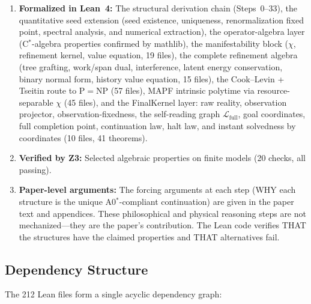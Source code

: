 \begin{enumerate}[nosep, label=(\roman*)]
  \item \textbf{Formalized in Lean~4:} The structural derivation chain
        (Steps~0--33), the quantitative seed extension (seed existence,
        uniqueness, renormalization fixed point, spectral analysis, and
        numerical extraction), the operator-algebra layer (C$^*$-algebra
        properties confirmed by mathlib), the manifestability block
        ($\chi$, refinement kernel, value equation, 19 files), the
        complete refinement algebra (tree grafting, work/span dual,
        interference, latent energy conservation, binary normal form,
        history value equation, 15 files), the Cook--Levin + Tseitin
        route to P$=$NP (57 files), MAPF intrinsic polytime via
        resource-separable $\chi$ (45 files), and the FinalKernel layer:
        raw reality, observation projector, observation-fixedness,
        the self-reading graph $\mathcal{L}_{\mathrm{full}}$,
        goal coordinates, full completion point, continuation law,
        halt law, and instant solvedness by coordinates
        (10 files, 41 theorems).
  \item \textbf{Verified by Z3:} Selected algebraic properties on finite
        models (20 checks, all passing).
  \item \textbf{Paper-level arguments:} The forcing arguments at each
        step (WHY each structure is the unique A0$^*$-compliant
        continuation) are given in the paper text and appendices.
        These philosophical and physical reasoning steps are not
        mechanized---they are the paper's contribution.  The Lean code
        verifies THAT the structures have the claimed properties and
        THAT alternatives fail.
\end{enumerate}

\subsection{Dependency Structure}

The 212 Lean files form a single acyclic dependency graph:

